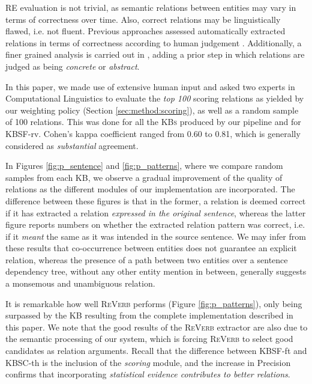\textsc{RE} evaluation is not trivial, as semantic relations between entities may vary in terms of correctness over time. Also, correct relations may be linguistically flawed, i.e. not fluent. Previous approaches assessed automatically extracted relations in terms of correctness according to human judgement \cite{Fader2011,Mausam2012}. Additionally, a finer grained analysis is carried out in \cite{Bankoetal2007}, adding a prior step in which relations are judged as being \textit{concrete} or \textit{abstract}.

In this paper, we made use of extensive human input and asked two experts in Computational Linguistics to evaluate the \textit{top 100} scoring relations as yielded by our weighting policy (Section \ref{sec:method:scoring}), as well as a random sample of 100 relations. This was done for all the \textsc{KBs} produced by our pipeline and for \textsc{KBSF}-rv. Cohen's kappa coefficient ranged from 0.60 to 0.81, which is generally considered as \textit{substantial} agreement.


In Figures \ref{fig:p_sentence} and \ref{fig:p_patterns}, where we compare random samples from each \textsc{KB}, we observe a gradual improvement of the quality of relations as the different modules of our implementation are incorporated. The difference between these figures is that in the former, a relation is deemed correct if it has extracted a relation \textit{expressed in the original sentence}, whereas the latter figure reports numbers on whether the extracted relation pattern was correct, i.e. if it \textit{meant} the same as it was intended in the source sentence. We may infer from these results that co-occurrence between entities does not guarantee an explicit relation, whereas the presence of a path between two entities over a sentence dependency tree, without any other entity mention in between, generally suggests a monsemous and unambiguous relation.

It is remarkable how well \textsc{ReVerb} performs (Figure \ref{fig:p_patterns}), only being surpassed by the \textsc{KB} resulting from the complete implementation described in this paper. We note that the good results of the \textsc{ReVerb} extractor are also due to the semantic processing of our system, which is forcing \textsc{ReVerb} to select good candidates as relation arguments. Recall that the difference between \textsc{KBSF}-ft and \textsc{KBSC}-th is the inclusion of the \textit{scoring} module, and the increase in Precision confirms that incorporating \textit{statistical evidence contributes to better relations}.

